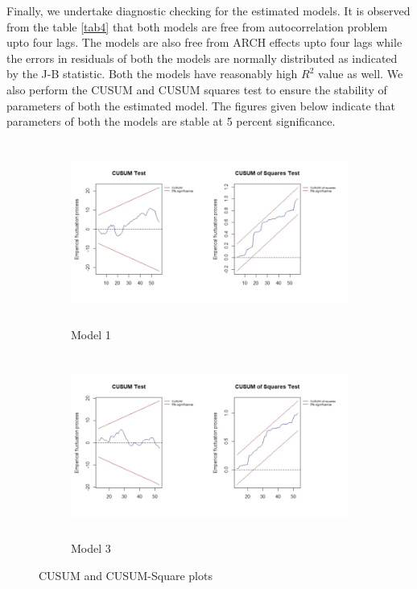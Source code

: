 \documentclass[a4paper,12pt]{article}
\begin{document}
Finally, we undertake diagnostic checking for the estimated models. It is observed from the table \ref{tab4} that both models are free from autocorrelation problem upto four lags. The models are also free from ARCH effects upto four lags while the errors in residuals of both the models are normally distributed as indicated by the J-B statistic. Both the models have reasonably high $R^2$ value as well. We also perform the CUSUM and CUSUM squares test to ensure the stability of parameters of both the estimated model. The figures given below indicate that parameters of both the models are stable at 5 percent significance.
\begin{figure}[H]
	\begin{subfigure}{\linewidth}
		\includegraphics[width=15cm,height=6cm]{cusum_collage}
		\caption{Model 1}
	\end{subfigure}
	\begin{subfigure}{\linewidth}
	\includegraphics[width=15cm,height=6cm]{cusum2_collage}
	\caption{Model 3}
\end{subfigure}
\caption{CUSUM and CUSUM-Square plots}
\end{figure}
\end{document}
